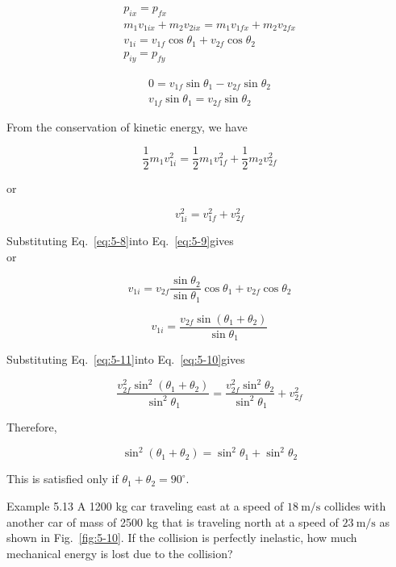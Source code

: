 \documentclass[10pt]{article}
\numberwithin{equation}{section}
\begin{document}
\begin{gather}
p_{i x}=p_{f x} \\
m_{1} v_{1 i x}+m_{2} v_{2 i x}=m_{1} v_{1 f x}+m_{2} v_{2 f x} \\
v_{1 i}=v_{1 f} \cos \theta_{1}+v_{2 f} \cos \theta_{2}  \label{eq:5-8}\\
p_{i y}=p_{f y}
\end{gather}



\begin{gather}
0=v_{1 f} \sin \theta_{1}-v_{2 f} \sin \theta_{2} \\
v_{1 f} \sin \theta_{1}=v_{2 f} \sin \theta_{2} \label{eq:5-9}
\end{gather}


From the conservation of kinetic energy, we have

$$
\frac{1}{2} m_{1} v_{1 i}^{2}=\frac{1}{2} m_{1} v_{1 f}^{2}+\frac{1}{2} m_{2} v_{2 f}^{2}
$$

or


\begin{equation}
v_{1 i}^{2}=v_{1 f}^{2}+v_{2 f}^{2} \label{eq:5-10}
\end{equation}


Substituting Eq.~\eqref{eq:5-8}into Eq.~\eqref{eq:5-9}gives\\
or

$$
v_{1 i}=v_{2 f} \frac{\sin \theta_{2}}{\sin \theta_{1}} \cos \theta_{1}+v_{2 f} \cos \theta_{2}
$$


\begin{equation}
v_{1 i}=\frac{v_{2 f} \sin \left(\theta_{1}+\theta_{2}\right)}{\sin \theta_{1}} \label{eq:5-11}
\end{equation}


Substituting Eq.~\eqref{eq:5-11}into Eq.~\eqref{eq:5-10}gives

$$
\frac{v_{2 f}^{2} \sin ^{2}\left(\theta_{1}+\theta_{2}\right)}{\sin ^{2} \theta_{1}}=\frac{v_{2 f}^{2} \sin ^{2} \theta_{2}}{\sin ^{2} \theta_{1}}+v_{2 f}^{2}
$$

Therefore,

$$
\sin ^{2}\left(\theta_{1}+\theta_{2}\right)=\sin ^{2} \theta_{1}+\sin ^{2} \theta_{2}
$$

This is satisfied only if $\theta_{1}+\theta_{2}=90^{\circ}$.

Example 5.13 A 1200 kg car traveling east at a speed of $18 \mathrm{~m} / \mathrm{s}$ collides with another car of mass of 2500 kg that is traveling north at a speed of $23 \mathrm{~m} / \mathrm{s}$ as shown in Fig.~\ref{fig:5-10}. If the collision is perfectly inelastic, how much mechanical energy is lost due to the collision?
\end{document}
